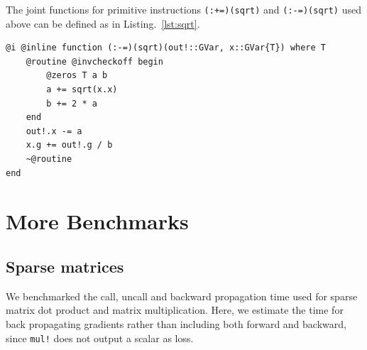 \documentclass{article}
\newcommand{\<}{\langle}
\renewcommand{\>}{\rangle}
\newcommand{\Lst}[1]{Listing.~\ref{#1}}
\newcommand{\ra}[1]{\renewcommand{\arraystretch}{#1}}
\theoremstyle{definition}\newtheorem{definition}{\textit{Definition}}
\begin{document}
The joint functions for primitive instructions \texttt{(:+=)(sqrt)} and \texttt{(:-=)(sqrt)} used above can be defined as in \Lst{lst:sqrt}.

\begin{minipage}{.88\textwidth}
    \begin{lstlisting}[mathescape=true,caption={Adjoints for primitives \texttt{(:+=)(sqrt)} and \texttt{(:-=)(sqrt)}.},label={lst:sqrt}, frame=tlrb]
@i @inline function (:-=)(sqrt)(out!::GVar, x::GVar{T}) where T
    @routine @invcheckoff begin
        @zeros T a b
        a += sqrt(x.x)
        b += 2 * a
    end
    out!.x -= a
    x.g += out!.g / b
    ~@routine
end
\end{lstlisting}
\end{minipage}

\section{More Benchmarks}\label{app:morebenchmarks}
\subsection{Sparse matrices}\label{sec:benchsparse}
We benchmarked the call, uncall and backward propagation time used for sparse matrix dot product and matrix multiplication.
Here, we estimate the time for back propagating gradients rather than including both forward and backward, since \texttt{mul!} does not output a scalar as loss.

\begin{table}[h!]\centering
\begin{minipage}{0.8\columnwidth}
\ra{1.3}
    \caption{Absolute runtimes in seconds for computing the objectives (O) and the backward pass (B) of sparse matrix operations. The matrix size is $1000 \times 1000$, and the element density is $0.05$. The total time used in computing gradient can be estimated by summing ``O'' and ``B''.
    }\label{tbl:sparse}
\end{minipage}
\end{table}
\end{document}
